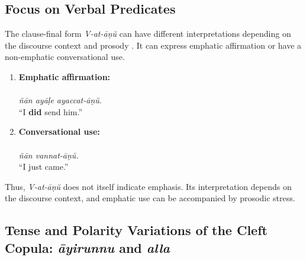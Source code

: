 \subsection{Focus on Verbal Predicates}
\label{sec:focus_on_verb}

The clause-final form \textit{V-at-āṇŭ} can have different interpretations
depending on the discourse context and prosody \citep[§11.2, §15.1]{moag2002malayalam}.
It can express emphatic affirmation or have a non-emphatic conversational use.

\begin{enumerate}[label=\textbf{\arabic*.}]
    \item \textbf{Emphatic affirmation:}\\
    \\
    \textit{ñān ayāḷe ayaccat-āṇŭ.}\\
    ``I \textbf{did} send him.'' \citep[§11.2, Ex.~3.D, p.~163]{moag2002malayalam}

    \item \textbf{Conversational use:}\\
    \\
    \textit{ñān vannat-āṇŭ.}\\
    ``I just came.'' \citep[§15.1, p.~219]{moag2002malayalam}
\end{enumerate}

Thus, \textit{V-at-āṇŭ} does not itself indicate emphasis. Its interpretation
depends on the discourse context, and emphatic use can be accompanied by
prosodic stress.

\subsection{Tense and Polarity Variations of the Cleft Copula: \textit{āyirunnu} and \textit{alla}}
\label{sec:copula_tense_polarity}

